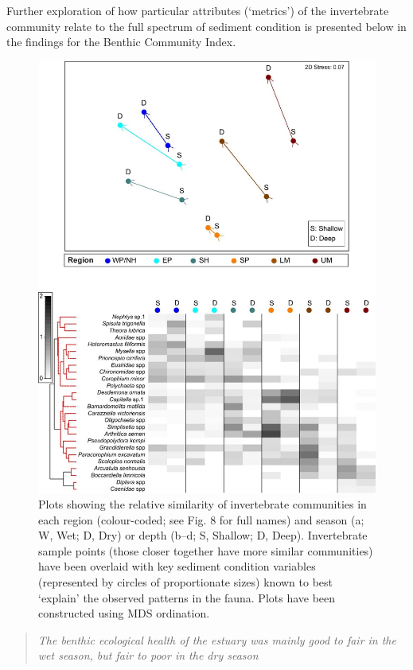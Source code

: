 \documentclass[
]{book}
\begin{document}
Further exploration of how particular attributes (`metrics') of the invertebrate community relate to the full spectrum of sediment condition is presented below in the findings for the Benthic Community Index.

\begin{figure}
\includegraphics[width=1\linewidth]{images/BMI/picture11} \caption{Plots showing the relative similarity of invertebrate communities in each region (colour-coded; see Fig. 8 for full names) and season (a; W, Wet; D, Dry) or depth (b–d; S, Shallow; D, Deep). Invertebrate sample points (those closer together have more similar communities) have been overlaid with key sediment condition variables (represented by circles of proportionate sizes) known to best ‘explain’ the observed patterns in the fauna. Plots have been constructed using MDS ordination.}\label{fig:BMI-pic12}
\end{figure}

\begin{quote}
\emph{The benthic ecological health of the estuary was mainly good to fair in the wet season, but fair to poor in the dry season}
\end{quote}
\end{document}
